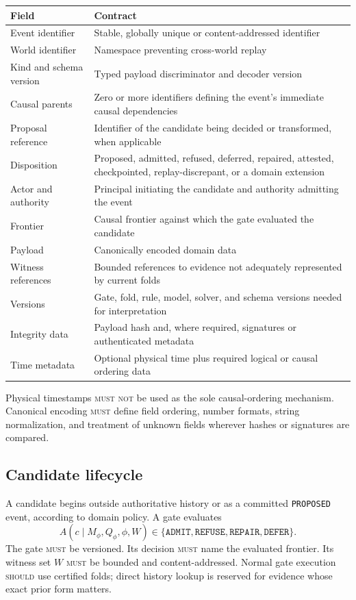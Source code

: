\documentclass[11pt]{article}
\newcommand{\MUST}{\textsc{must}}
\newcommand{\MUSTNOT}{\textsc{must not}}
\newcommand{\SHOULD}{\textsc{should}}
\begin{document}
\begin{longtable}{p{}p{}}
\toprule
Field & Contract \\
\midrule
Event identifier & Stable, globally unique or content-addressed identifier \\
World identifier & Namespace preventing cross-world replay \\
Kind and schema version & Typed payload discriminator and decoder version \\
Causal parents & Zero or more identifiers defining the event's immediate causal dependencies \\
Proposal reference & Identifier of the candidate being decided or transformed, when applicable \\
Disposition & Proposed, admitted, refused, deferred, repaired, attested, checkpointed, replay-discrepant, or a domain extension \\
Actor and authority & Principal initiating the candidate and authority admitting the event \\
Frontier & Causal frontier against which the gate evaluated the candidate \\
Payload & Canonically encoded domain data \\
Witness references & Bounded references to evidence not adequately represented by current folds \\
Versions & Gate, fold, rule, model, solver, and schema versions needed for interpretation \\
Integrity data & Payload hash and, where required, signatures or authenticated metadata \\
Time metadata & Optional physical time plus required logical or causal ordering data \\
\bottomrule
\end{longtable}

Physical timestamps \MUSTNOT{} be used as the sole causal-ordering mechanism. Canonical encoding \MUST{} define field ordering, number formats, string normalization, and treatment of unknown fields wherever hashes or signatures are compared.

\subsection{Candidate lifecycle}

A candidate begins outside authoritative history or as a committed \texttt{PROPOSED} event, according to domain policy. A gate evaluates
\[
A(c\mid M_{\phi},Q_{\phi},\phi,W)\in
\{\texttt{ADMIT},\texttt{REFUSE},\texttt{REPAIR},\texttt{DEFER}\}.
\]
The gate \MUST{} be versioned. Its decision \MUST{} name the evaluated frontier. Its witness set $W$ \MUST{} be bounded and content-addressed. Normal gate execution \SHOULD{} use certified folds; direct history lookup is reserved for evidence whose exact prior form matters.
\end{document}

